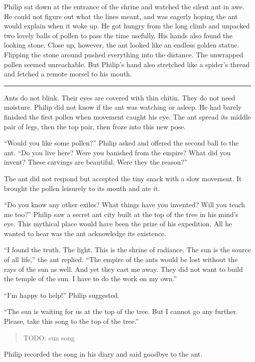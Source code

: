 \documentclass[10pt, draft]{memoir}
\renewcommand{\pfbreakdisplay}{\bigskip \ding{166} \bigskip}
\newcommand{\secbreak}{\fancybreak{\pfbreakdisplay}}
\begin{document}
Philip sat down at the entrance of the shrine and watched the silent ant in awe. He could not figure out what the lines meant, and was eagerly hoping the ant would explain when it woke up. He got hungry from the long climb and unpacked two lovely balls of pollen to pass the time usefully. His hands also found the looking stone. Close up, however, the ant looked like an endless golden statue. Flipping the stone around pushed everything into the distance. The unwrapped pollen seemed unreachable. But Philip's hand also stretched like a spider's thread and fetched a remote morsel to his mouth.

\secbreak

Ants do not blink. Their eyes are covered with thin chitin. They do not need moisture. Philip did not know if the ant was watching or asleep. He had barely finished the first pollen when movement caught his eye. The ant spread its middle pair of legs, then the top pair, then froze into this new pose.

``Would you like some pollen?'' Philip asked and offered the second ball to the ant. ``Do you live here? Were you banished from the empire? What did you invent? These carvings are beautiful. Were they the reason?''

The ant did not respond but accepted the tiny snack with a slow movement. It brought the pollen leisurely to its mouth and ate it.

``Do you know any other exiles? What things have you invented? Will you teach me too?'' Philip saw a secret ant city built at the top of the tree in his mind's eye. This mythical place would have been the prize of his expedition. All he wanted to hear was the ant acknowledge its existence.

``I found the truth. The light. This is the shrine of radiance. The sun is the source of all life,'' the ant replied. ``The empire of the ants would be lost without the rays of the sun as well. And yet they cast me away. They did not want to build the temple of the sun. I have to do the work on my own.''

``I'm happy to help!'' Philip suggested.

``The sun is waiting for us at the top of the tree. But I cannot go any further. Please, take this song to the top of the tree.”


\begin{verse}
TODO: sun song
\end{verse}


Philip recorded the song in his diary and said goodbye to the ant.
\end{document}

